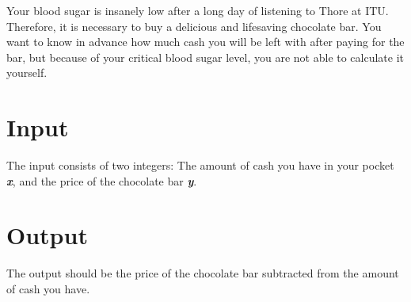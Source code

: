 

Your blood sugar is insanely low after a long day of listening to Thore at ITU. Therefore, it is necessary to buy a delicious and lifesaving chocolate bar. You want to know in advance how much cash you will be left with after paying for the bar, but because of your critical blood sugar level, you are not able to calculate it yourself. 

\section*{Input}

The input consists of two integers: The amount of cash you have in your pocket \textbf{\textit{x}}, and the price of the chocolate bar \textbf{\textit{y}}.

\section*{Output}

The output should be the price of the chocolate bar subtracted from the amount of cash you have.